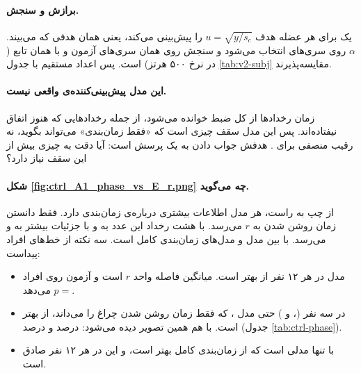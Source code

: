 \paragraph{برازش و سنجش.} یک  برای هر عضله هدف $u=\sqrt{y/s_c}$ را پیش‌بینی می‌کند، یعنی همان هدفی که  می‌بیند. $\alpha$ روی سری‌های  انتخاب می‌شود و سنجش روی همان سری‌های آزمون  و با همان تابع ( در نرخ ۵۰۰ هرتز) است. پس اعداد مستقیم با جدول \ref{tab:v2-subj} مقایسه‌پذیرند.

\paragraph{این مدل پیش‌بینی‌کننده‌ی واقعی نیست.} زمان رخدادها از کل ضبط خوانده می‌شود، از جمله رخدادهایی که هنوز اتفاق نیفتاده‌اند. پس این مدل سقف چیزی است که «فقط زمان‌بندی» می‌تواند بگوید، نه رقیب منصفی برای . هدفش جواب دادن به یک پرسش است: آیا دقت  به چیزی بیش از این سقف نیاز دارد؟




\paragraph{شکل \ref{fig:ctrl_A1_phase_vs_E_r.png} چه می‌گوید.} از چپ به راست، هر مدل اطلاعات بیشتری درباره‌ی زمان‌بندی دارد. فقط دانستن زمان روشن شدن  به $r$  می‌رسد. با هشت رخداد این عدد به  و با جزئیات بیشتر به  و  می‌رسد.  با  بین مدل  و مدل‌های زمان‌بندی کامل است. سه نکته از خط‌های افراد پیداست:
\begin{itemize}
\item مدل  در هر ۱۲ نفر از  بهتر است. میانگین فاصله  واحد $r$ است و آزمون  روی افراد $p=$  می‌دهد.
\item در سه نفر (،  و ) حتی مدل ، که فقط زمان روشن شدن چراغ را می‌داند، از  بهتر است. با  هم همین تصویر دیده می‌شود:   درصد و   درصد (جدول \ref{tab:ctrl-phase}).
\item {} با  تنها مدلی است که از زمان‌بندی کامل بهتر است، و این در هر ۱۲ نفر صادق است.
\end{itemize}


